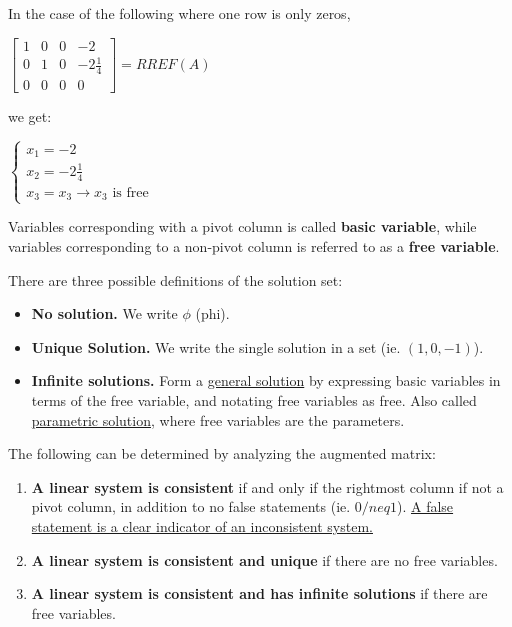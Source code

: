 \documentclass{report}
\begin{document}
In the case of the following where one row is only zeros,
\begin{center}
	$\begin{bmatrix}
		1 & 0 & 0 & -2 \\
		0 & 1 & 0 & -2\frac{1}{4} \\
		0 & 0 & 0 & 0
	\end{bmatrix} = RREF(A)$
\end{center}
we get:
\begin{center}
	$\begin{cases}
		x_1 = -2\\
		x_2 = -2\frac{1}{4}\\
		x_3 = x_3 \rightarrow x_3 \text{ is free}
	\end{cases}$
\end{center}
\begin{definition}
	Variables corresponding with a pivot column is called \textbf{basic variable}, while variables corresponding to a non-pivot column is referred to as a \textbf{free variable}.
\end{definition}
There are three possible definitions of the solution set:
\begin{itemize}
	\item \textbf{No solution.} We write $\phi$ (phi).
	\item \textbf{Unique Solution.} We write the single solution in a set (ie. ${(1, 0, -1)}$).
	\item \textbf{Infinite solutions.} Form a \underline{general solution} by expressing basic variables in terms of the free variable, and notating free variables as free. Also called \underline{parametric solution}, where free variables are the parameters.
\end{itemize}
\begin{theorem}
	The following can be determined by analyzing the augmented matrix:
	\begin{enumerate}
		\item \textbf{A linear system is consistent} if and only if the rightmost column if not a pivot column, in addition to no false statements (ie. $0/neq 1$). \underline{A false statement is a clear indicator of an inconsistent system.}
		\item \textbf{A linear system is consistent and unique} if there are no free variables.
		\item \textbf{A linear system is consistent and has infinite solutions} if there are free variables.
	\end{enumerate}
\end{theorem}
\end{document}
